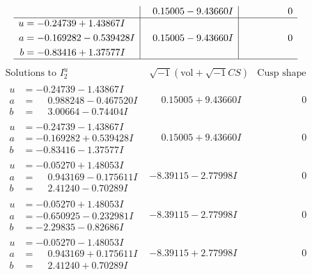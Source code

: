 \documentclass[1p]{elsarticle_modified}
\theoremstyle{definition}
\newcommand{\I}{\sqrt{-1}}
\begin{document}
$$\begin{array}{c|c|c}
 & \phantom{-}0.15005 - 9.43660 I & \phantom{-0.000000 } 0 \\ \hline\begin{aligned}
u &= -0.24739 + 1.43867 I \\
a &= -0.169282 - 0.539428 I \\
b &= -0.83416 + 1.37577 I\end{aligned}
 & \phantom{-}0.15005 - 9.43660 I & \phantom{-0.000000 } 0\\
 \hline 
 \end{array}$$\newpage$$\begin{array}{c|c|c}  
\text{Solutions to }I^u_{2}& \I (\text{vol} + \sqrt{-1}CS) & \text{Cusp shape}\\
 \hline 
\begin{aligned}
u &= -0.24739 - 1.43867 I \\
a &= \phantom{-}0.988248 - 0.467520 I \\
b &= \phantom{-}3.00664 - 0.74404 I\end{aligned}
 & \phantom{-}0.15005 + 9.43660 I & \phantom{-0.000000 } 0 \\ \hline\begin{aligned}
u &= -0.24739 - 1.43867 I \\
a &= -0.169282 + 0.539428 I \\
b &= -0.83416 - 1.37577 I\end{aligned}
 & \phantom{-}0.15005 + 9.43660 I & \phantom{-0.000000 } 0 \\ \hline\begin{aligned}
u &= -0.05270 + 1.48053 I \\
a &= \phantom{-}0.943169 - 0.175611 I \\
b &= \phantom{-}2.41240 - 0.70289 I\end{aligned}
 & -8.39115 - 2.77998 I & \phantom{-0.000000 } 0 \\ \hline\begin{aligned}
u &= -0.05270 + 1.48053 I \\
a &= -0.650925 - 0.232981 I \\
b &= -2.29835 - 0.82686 I\end{aligned}
 & -8.39115 - 2.77998 I & \phantom{-0.000000 } 0 \\ \hline\begin{aligned}
u &= -0.05270 - 1.48053 I \\
a &= \phantom{-}0.943169 + 0.175611 I \\
b &= \phantom{-}2.41240 + 0.70289 I\end{aligned}
 & -8.39115 + 2.77998 I & \phantom{-0.000000 } 0 \\ \hline\begin{aligned}

\end{aligned}
\end{array}$$
\end{document}
